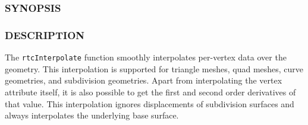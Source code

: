 \begin{Shaded}
\begin{Highlighting}[]
\OperatorTok{{-}}
\end{Highlighting}
\end{Shaded}

\subsubsection{SYNOPSIS}\label{synopsis}

\begin{Shaded}
\begin{Highlighting}[]

\OperatorTok{\{}
\OperatorTok{;}
   \OperatorTok{;}
  \OperatorTok{;}
  \OperatorTok{;}
  \OperatorTok{;}
   \OperatorTok{;}
  \OperatorTok{*}\OperatorTok{;}
  \OperatorTok{*}\OperatorTok{;}
  \OperatorTok{*}\OperatorTok{;}
  \OperatorTok{*}\OperatorTok{;}
  \OperatorTok{*}\OperatorTok{;}
  \OperatorTok{*}\OperatorTok{;}
   \OperatorTok{;}
\OperatorTok{\};}

\OperatorTok{(}
   \OperatorTok{*}
\OperatorTok{);}
\end{Highlighting}
\end{Shaded}

\subsubsection{DESCRIPTION}\label{description}

The \texttt{rtcInterpolate} function smoothly interpolates per-vertex
data over the geometry. This interpolation is supported for triangle
meshes, quad meshes, curve geometries, and subdivision geometries. Apart
from interpolating the vertex attribute itself, it is also possible to
get the first and second order derivatives of that value. This
interpolation ignores displacements of subdivision surfaces and always
interpolates the underlying base surface.


